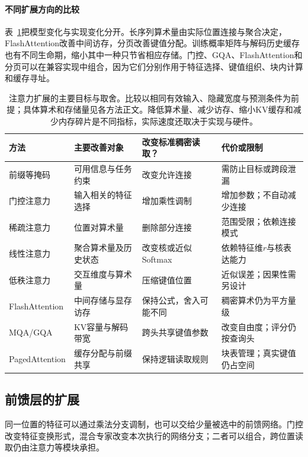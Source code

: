 \paragraph{不同扩展方向的比较}

表~\ref{tab:transformer-attention-extensions}把模型变化与实现变化分开。长序列算术量由实际位置连接与聚合决定，FlashAttention改善中间访存，分页改善键值分配。训练概率矩阵与解码历史缓存也有不同生命期，缩小其中一种只节省相应存储。门控、GQA、FlashAttention和分页可以在兼容实现中组合，因为它们分别作用于特征选择、键值组织、块内计算和缓存寻址。

\begin{table}[htbp]
  \centering
  \small
  \begin{tabular}{@{}p{30mm}p{37mm}p{39mm}p{49mm}@{}}
    \toprule
    方法 & 主要改善对象 & 改变标准稠密读取？ & 代价或限制 \\
    \midrule
    前缀等掩码 & 可用信息与任务约束 & 改变允许连接 & 需防止目标或跨段泄漏 \\
    门控注意力 & 输入相关的特征选择 & 增加乘性调制 & 增加参数；不自动减少连接 \\
    稀疏注意力 & 位置对算术量 & 删除部分连接 & 范围受限；依赖连接模式 \\
    线性注意力 & 聚合算术量及历史状态 & 改变核或近似Softmax & 依赖特征维$r$与核表达能力 \\
    低秩注意力 & 交互维度与算术量 & 压缩键值位置 & 近似误差；因果性需另设计 \\
    FlashAttention & 中间存储与显存访存 & 保持公式，舍入可能不同 & 稠密算术仍为平方量级 \\
    MQA/GQA & KV容量与解码带宽 & 跨头共享键值参数 & 改变自由度；评分仍按查询头 \\
    PagedAttention & 缓存分配与前缀共享 & 保持逻辑读取规则 & 块表管理；真实键值仍占空间 \\
    \bottomrule
  \end{tabular}
  \caption{注意力扩展的主要目标与取舍。比较以相同有效输入、隐藏宽度与预测条件为前提；具体算术和存储量见各方法正文。降低算术量、减少访存、缩小KV缓存和减少内存碎片是不同指标，实际速度还取决于实现与硬件。}
  \label{tab:transformer-attention-extensions}
\end{table}

\subsection{前馈层的扩展}
\label{sec:transformer-ffn-extensions}

同一位置的特征可以通过乘法分支调制，也可以交给少量被选中的前馈网络。门控改变特征变换形式，混合专家改变本次执行的网络分支；二者可以组合，跨位置读取仍由注意力等模块承担。

